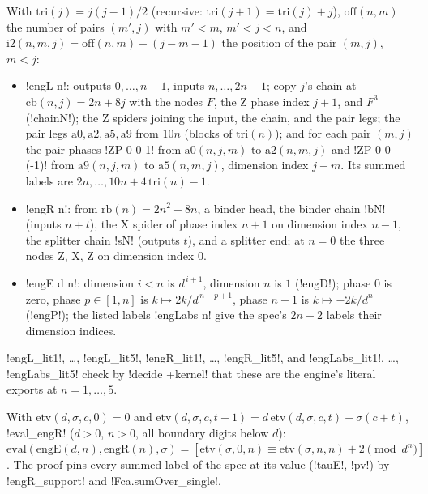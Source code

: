 {\begin{definition}\label{def:boxes-fca-eng}
With $\mathrm{tri}(j)=j(j-1)/2$ (recursive: $\mathrm{tri}(j+1)=\mathrm{tri}(j)+j$), $\mathrm{off}(n,m)$ the number of pairs $(m',j)$ with $m'<m$, $m'<j<n$, and $\mathrm{i2}(n,m,j)=\mathrm{off}(n,m)+(j-m-1)$ the position of the pair $(m,j)$, $m<j$:
\begin{itemize}
\item \lbx!engL n!: outputs $0,\ldots,n-1$, inputs $n,\ldots,2n-1$; copy $j$'s chain at $\mathrm{cb}(n,j)=2n+8j$ with the nodes $F$, the Z phase index $j+1$, and $F^3$ (\lbx!chainN!); the Z spiders joining the input, the chain, and the pair legs; the pair legs $\mathrm{a0},\mathrm{a2},\mathrm{a5},\mathrm{a9}$ from $10n$ (blocks of $\mathrm{tri}(n)$); and for each pair $(m,j)$ the pair phases \lbx!ZP 0 0 1! from $\mathrm{a0}(n,j,m)$ to $\mathrm{a2}(n,m,j)$ and \lbx!ZP 0 0 (-1)! from $\mathrm{a9}(n,j,m)$ to $\mathrm{a5}(n,m,j)$, dimension index $j-m$. Its summed labels are $2n,\ldots,10n+4\,\mathrm{tri}(n)-1$.
\item \lbx!engR n!: from $\mathrm{rb}(n)=2n^2+8n$, a binder head, the binder chain \lbx!bN! (inputs $n+t$), the X spider of phase index $n+1$ on dimension index $n-1$, the splitter chain \lbx!sN! (outputs $t$), and a splitter end; at $n=0$ the three nodes Z, X, Z on dimension index $0$.
\item \lbx!engE d n!: dimension $i<n$ is $d^{\,i+1}$, dimension $n$ is $1$ (\lbx!engD!); phase $0$ is zero, phase $p\in[1,n]$ is $k\mapsto 2k/d^{\,n-p+1}$, phase $n+1$ is $k\mapsto -2k/d^n$ (\lbx!engP!); the listed labels \lbx!engLabs n! give the spec's $2n+2$ labels their dimension indices.
\end{itemize}
\lbx!engL_lit1!, \ldots, \lbx!engL_lit5!, \lbx!engR_lit1!, \ldots, \lbx!engR_lit5!, and \lbx!engLabs_lit1!, \ldots, \lbx!engLabs_lit5! check by \lbx!decide +kernel! that these are the engine's literal exports at $n=1,\ldots,5$.
\end{definition}

\begin{theorem}\label{thm:boxes-fca-eng-R}
With $\mathrm{etv}(d,\sigma,c,0)=0$ and $\mathrm{etv}(d,\sigma,c,t+1)=d\,\mathrm{etv}(d,\sigma,c,t)+\sigma(c+t)$, \lbx!eval_engR! ($d>0$, $n>0$, all boundary digits below $d$): $\mathrm{eval}(\mathrm{engE}(d,n),\mathrm{engR}(n),\sigma)=[\mathrm{etv}(\sigma,0,n)\equiv\mathrm{etv}(\sigma,n,n)+2\pmod{d^n}]$. The proof pins every summed label of the spec at its value (\lbx!tauE!, \lbx!pv!) by \lbx!engR_support! and \lbx!Fca.sumOver_single!.
\end{theorem}

}
